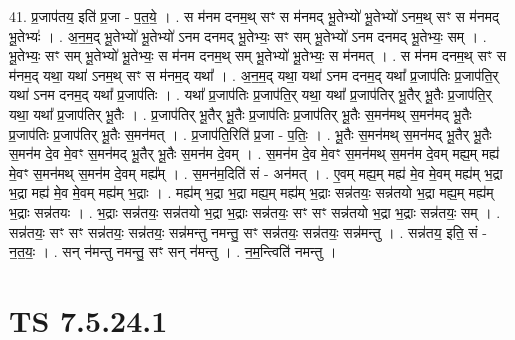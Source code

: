 \documentclass[17pt]{extarticle}
\begin{document}
41. प्र॒जाप॑तय॒ इति॑ प्र॒जा - प॒त॒ये॒ । . स म॑नम दनम॒थ् सꣳ स म॑नमद् भू॒तेभ्यो॑ भू॒तेभ्यो॑ ऽनम॒थ् सꣳ स म॑नमद् भू॒तेभ्यः॑ । . अ॒न॒म॒द् भू॒तेभ्यो॑ भू॒तेभ्यो॑ ऽनम दनमद् भू॒तेभ्यः॒ सꣳ सम् भू॒तेभ्यो॑ ऽनम दनमद् भू॒तेभ्यः॒ सम् । . भू॒तेभ्यः॒ सꣳ सम् भू॒तेभ्यो॑ भू॒तेभ्यः॒ स म॑नम दनम॒थ् सम् भू॒तेभ्यो॑ भू॒तेभ्यः॒ स म॑नमत् । . स म॑नम दनम॒थ् सꣳ स म॑नम॒द् यथा॒ यथा॑ ऽनम॒थ् सꣳ स म॑नम॒द् यथा᳚ । . अ॒न॒म॒द् यथा॒ यथा॑ ऽनम दनम॒द् यथा᳚ प्र॒जाप॑तिः प्र॒जाप॑ति॒र् यथा॑ ऽनम दनम॒द् यथा᳚ प्र॒जाप॑तिः । . यथा᳚ प्र॒जाप॑तिः प्र॒जाप॑ति॒र् यथा॒ यथा᳚ प्र॒जाप॑तिर् भू॒तैर् भू॒तैः प्र॒जाप॑ति॒र् यथा॒ यथा᳚ प्र॒जाप॑तिर् भू॒तैः । . प्र॒जाप॑तिर् भू॒तैर् भू॒तैः प्र॒जाप॑तिः प्र॒जाप॑तिर् भू॒तैः स॒मन॑मथ् स॒मन॑मद् भू॒तैः प्र॒जाप॑तिः प्र॒जाप॑तिर् भू॒तैः स॒मन॑मत् । . प्र॒जाप॑ति॒रिति॑ प्र॒जा - प॒तिः॒ । . भू॒तैः स॒मन॑मथ् स॒मन॑मद् भू॒तैर् भू॒तैः स॒मन॑म दे॒व मे॒वꣳ स॒मन॑मद् भू॒तैर् भू॒तैः स॒मन॑म दे॒वम् । . स॒मन॑म दे॒व मे॒वꣳ स॒मन॑मथ् स॒मन॑म दे॒वम् मह्य॒म् मह्य॑ मे॒वꣳ स॒मन॑मथ् स॒मन॑म दे॒वम् मह्य᳚म् । . स॒मन॑म॒दिति॑ सं - अन॑मत् । . ए॒वम् मह्य॒म् मह्य॑ मे॒व मे॒वम् मह्य॑म् भ॒द्रा भ॒द्रा मह्य॑ मे॒व मे॒वम् मह्य॑म् भ॒द्राः । . मह्य॑म् भ॒द्रा भ॒द्रा मह्य॒म् मह्य॑म् भ॒द्राः सन्न॑तयः॒ सन्न॑तयो भ॒द्रा मह्य॒म् मह्य॑म् भ॒द्राः सन्न॑तयः । . भ॒द्राः सन्न॑तयः॒ सन्न॑तयो भ॒द्रा भ॒द्राः सन्न॑तयः॒ सꣳ सꣳ सन्न॑तयो भ॒द्रा भ॒द्राः सन्न॑तयः॒ सम् । . सन्न॑तयः॒ सꣳ सꣳ सन्न॑तयः॒ सन्न॑तयः॒ सन्न॑मन्तु नमन्तु॒ सꣳ सन्न॑तयः॒ सन्न॑तयः॒ सन्न॑मन्तु । . सन्न॑तय॒ इति॒ सं - न॒त॒यः॒ । . सन् न॑मन्तु नमन्तु॒ सꣳ सन् न॑मन्तु । . न॒म॒न्त्विति॑ नमन्तु । \newline
\pagebreak
{}

\section{ TS 7.5.24.1 }
\end{document}
